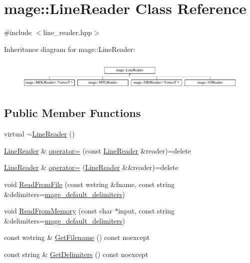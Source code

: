 \hypertarget{classmage_1_1_line_reader}{}\section{mage\+:\+:Line\+Reader Class Reference}
\label{classmage_1_1_line_reader}


{\ttfamily \#include $<$line\+\_\+reader.\+hpp$>$}

Inheritance diagram for mage\+:\+:Line\+Reader\+:\begin{figure}[H]
\begin{center}
\leavevmode
\includegraphics[height=1.458333cm]{classmage_1_1_line_reader}
\end{center}
\end{figure}
\subsection*{Public Member Functions}
\begin{DoxyCompactItemize}
\item 
virtual \hyperlink{classmage_1_1_line_reader_ad9753ea392ebe5b3867852d3392fb1e7}{$\sim$\+Line\+Reader} ()
\item 
\hyperlink{classmage_1_1_line_reader}{Line\+Reader} \& \hyperlink{classmage_1_1_line_reader_a2247078d0b5602f9a9a6b74019832faf}{operator=} (const \hyperlink{classmage_1_1_line_reader}{Line\+Reader} \&reader)=delete
\item 
\hyperlink{classmage_1_1_line_reader}{Line\+Reader} \& \hyperlink{classmage_1_1_line_reader_a45504c0ba4238eedf851cfb9df081a01}{operator=} (\hyperlink{classmage_1_1_line_reader}{Line\+Reader} \&\&reader)=delete
\item 
void \hyperlink{classmage_1_1_line_reader_a2df875468f06ec58c7aa1ff96157aeb0}{Read\+From\+File} (const wstring \&fname, const string \&delimiters=\hyperlink{namespacemage_ae247ad66af37a4b0d67ddca9404ca01a}{mage\+\_\+default\+\_\+delimiters})
\item 
void \hyperlink{classmage_1_1_line_reader_a1c21aba81c3873c7ed299ca978c4db74}{Read\+From\+Memory} (const char $\ast$input, const string \&delimiters=\hyperlink{namespacemage_ae247ad66af37a4b0d67ddca9404ca01a}{mage\+\_\+default\+\_\+delimiters})
\item 
const wstring \& \hyperlink{classmage_1_1_line_reader_a682ed8030c99a62d4409a01f9efa6d6b}{Get\+Filename} () const noexcept
\item 
const string \& \hyperlink{classmage_1_1_line_reader_aa00e1e27b614e11ec9f70e52d0bac551}{Get\+Delimiters} () const noexcept
\end{DoxyCompactItemize}
